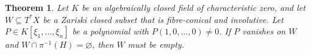 \documentclass[pdflatex,sn-mathphys-num]{sn-jnl}
\numberwithin{equation}{section}
\theoremstyle{thmstyleone}
\newtheorem{theorem}{Theorem}[section]
\theoremstyle{thmstyletwo}
\begin{document}

\begin{theorem}\label{thm:coisotropic-exclusion}
Let $K$ be an algebraically closed field of characteristic zero, and let
$W\subseteq T^*X$ be a Zariski closed subset that is fibre-conical and
involutive. Let $P\in K[\xi_1,\dots,\xi_n]$ be
a polynomial with $P(1,0,\dots,0)\neq0$. If $P$ vanishes on $W$ and $W\cap\pi^{-1}(H)=\varnothing$, then $W$ must be empty.
\end{theorem}

\end{document}
